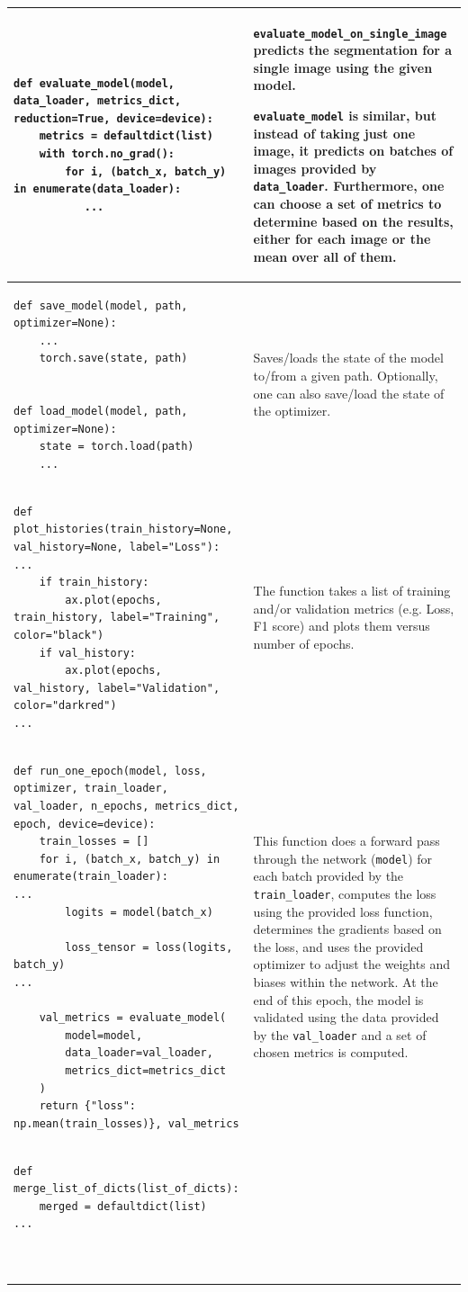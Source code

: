 \begin{longtable}{|m{}|m{}|}
\begin{lstlisting}
def evaluate_model(model, data_loader, metrics_dict, reduction=True, device=device):
    metrics = defaultdict(list)
    with torch.no_grad():
        for i, (batch_x, batch_y) in enumerate(data_loader):
           ...
\end{lstlisting} & \lstinline|evaluate_model_on_single_image| predicts the segmentation for a single image using the given model. \vspace{8px}

\lstinline|evaluate_model| is similar, but instead of taking just one image, it predicts on batches of images provided by \lstinline|data_loader|. Furthermore, one can choose a set of metrics to determine based on the results, either for each image or the mean over all of them. 
\\ \hline 
\begin{lstlisting}
def save_model(model, path, optimizer=None):
    ...
    torch.save(state, path)


def load_model(model, path, optimizer=None):
    state = torch.load(path)
    ...
\end{lstlisting} & Saves/loads the state of the model to/from a given path. Optionally, one can also save/load the state of the optimizer. 
\\ \hline 
\begin{lstlisting}
def plot_histories(train_history=None, val_history=None, label="Loss"):
...
    if train_history:
        ax.plot(epochs, train_history, label="Training", color="black")
    if val_history:
        ax.plot(epochs, val_history, label="Validation", color="darkred")
...
\end{lstlisting} & The function takes a list of training and/or validation metrics (e.g. Loss, F1 score) and plots them versus number of epochs.
\\ \hline 
\begin{lstlisting}
def run_one_epoch(model, loss, optimizer, train_loader, val_loader, n_epochs, metrics_dict, epoch, device=device):
    train_losses = []
    for i, (batch_x, batch_y) in enumerate(train_loader):
...
        logits = model(batch_x)

        loss_tensor = loss(logits, batch_y)
...

    val_metrics = evaluate_model(
        model=model,
        data_loader=val_loader,
        metrics_dict=metrics_dict
    )
    return {"loss": np.mean(train_losses)}, val_metrics
\end{lstlisting} & This function does a forward pass through the network (\lstinline|model|) for each batch provided by the \lstinline|train_loader|, computes the loss using the provided loss function, determines the gradients based on the loss, and uses the provided optimizer to adjust the weights and biases within the network. At the end of this epoch, the model is validated using the data provided by the \lstinline|val_loader| and a set of chosen metrics is computed. 
\\ \hline 
\begin{lstlisting}
def merge_list_of_dicts(list_of_dicts):
    merged = defaultdict(list)
...



\end{lstlisting}
\end{longtable}
